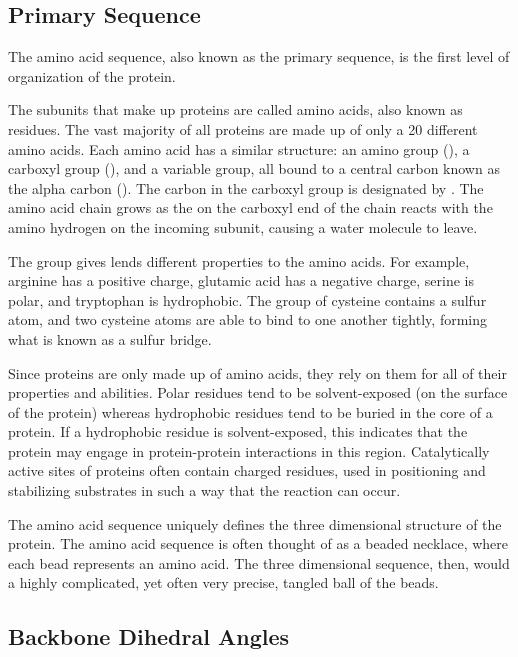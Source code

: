 \subsection{Primary Sequence}

The amino acid sequence, also known as the primary sequence, is the first level of organization of the protein.

The subunits that make up proteins are called amino acids, also known as residues. The vast majority of all proteins are made up of only a 20 different amino acids. Each amino acid has a similar structure: an amino group (), a carboxyl group (), and a variable  group, all bound to a central carbon known as the alpha carbon (). The carbon in the carboxyl group is designated by . The amino acid chain grows as the  on the carboxyl end of the chain reacts with the amino hydrogen on the incoming subunit, causing a water molecule to leave.

The  group gives lends different properties to the amino acids. For example, arginine has a positive charge, glutamic acid has a negative charge, serine is polar, and tryptophan is hydrophobic. The  group of cysteine contains a sulfur atom, and two cysteine atoms are able to bind to one another tightly, forming what is known as a sulfur bridge. 

Since proteins are only made up of amino acids, they rely on them for all of their properties and abilities. Polar residues tend to be solvent-exposed (on the surface of the protein) whereas hydrophobic residues tend to be buried in the core of a protein. If a hydrophobic residue is solvent-exposed, this indicates that the protein may engage in protein-protein interactions in this region. Catalytically active sites of proteins often contain charged residues, used in positioning and stabilizing substrates in such a way that the reaction can occur.

The amino acid sequence uniquely defines the three dimensional structure of the protein. The amino acid sequence is often thought of as a beaded necklace, where each bead represents an amino acid. The three dimensional sequence, then, would a highly complicated, yet often very precise, tangled ball of the beads.

\subsection{Backbone Dihedral Angles}



